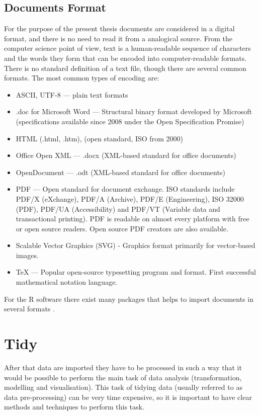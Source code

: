 \documentclass[]{book}
\providecommand{\tightlist}{%
  \setlength{\itemsep}{0pt}\setlength{\parskip}{0pt}}
\begin{document}
\subsection{Documents Format}\label{sotatoolsimportformat}

For the purpose of the present thesis documents are considered in a
digital format, and there is no need to read it from a analogical
source. From the computer science point of view, text is a
human-readable sequence of characters and the words they form that can
be encoded into computer-readable formats. There is no standard
definition of a text file, though there are several common formats. The
most common types of encoding are:

\begin{itemize}
\tightlist
\item
  ASCII, UTF-8 --- plain text formats
\item
  .doc for Microsoft Word --- Structural binary format developed by
  Microsoft (specifications available since 2008 under the Open
  Specification Promise)
\item
  HTML (.html, .htm), (open standard, ISO from 2000)
\item
  Office Open XML --- .docx (XML-based standard for office documents)
\item
  OpenDocument --- .odt (XML-based standard for office documents)
\item
  PDF --- Open standard for document exchange. ISO standards include
  PDF/X (eXchange), PDF/A (Archive), PDF/E (Engineering), ISO 32000
  (PDF), PDF/UA (Accessibility) and PDF/VT (Variable data and
  transactional printing). PDF is readable on almost every platform with
  free or open source readers. Open source PDF creators are also
  available.
\item
  Scalable Vector Graphics (SVG) - Graphics format primarily for
  vector-based images.
\item
  TeX --- Popular open-source typesetting program and format. First
  successful mathematical notation language.
\end{itemize}

For the R software there exist many packages that helps to import
documents in several formats \citep{readr2017r}.

\section{Tidy}\label{sotatoolstidy}

After that data are imported they have to be processed in such a way
that it would be possible to perform the main task of data analysis
(transformation, modelling and visualisation). This task of tidying data
(usually referred to as data pre-processing) can be very time expensive,
so it is important to have clear methods and techniques to perform this
task.
\end{document}
